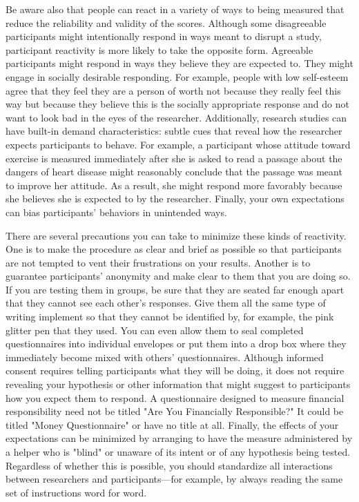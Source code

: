 Be aware also that people can react in a variety of ways to being measured that reduce the reliability and validity of the scores. Although some disagreeable participants might intentionally respond in ways meant to disrupt a study, participant reactivity is more likely to take the opposite form. Agreeable participants might respond in ways they believe they are expected to. They might engage in socially desirable responding. For example, people with low self-esteem agree that they feel they are a person of worth not because they really feel this way but because they believe this is the socially appropriate response and do not want to look bad in the eyes of the researcher. Additionally, research studies can have built-in demand characteristics: subtle cues that reveal how the researcher expects participants to behave. For example, a participant whose attitude toward exercise is measured immediately after she is asked to read a passage about the dangers of heart disease might reasonably conclude that the passage was meant to improve her attitude. As a result, she might respond more favorably because she believes she is expected to by the researcher. Finally, your own expectations can bias participants' behaviors in unintended ways.


There are several precautions you can take to minimize these kinds of reactivity. One is to make the procedure as clear and brief as possible so that participants are not tempted to vent their frustrations on your results. Another is to guarantee participants' anonymity and make clear to them that you are doing so. If you are testing them in groups, be sure that they are seated far enough apart that they cannot see each other's responses. Give them all the same type of writing implement so that they cannot be identified by, for example, the pink glitter pen that they used. You can even allow them to seal completed questionnaires into individual envelopes or put them into a drop box where they immediately become mixed with others' questionnaires. Although informed consent requires telling participants what they will be doing, it does not require revealing your hypothesis or other information that might suggest to participants how you expect them to respond. A questionnaire designed to measure financial responsibility need not be titled "Are You Financially Responsible?" It could be titled "Money Questionnaire" or have no title at all. Finally, the effects of your expectations can be minimized by arranging to have the measure administered by a helper who is "blind" or unaware of its intent or of any hypothesis being tested. Regardless of
whether this is possible, you should standardize all interactions between researchers and participants—for example, by always reading the same set of instructions word for word.

